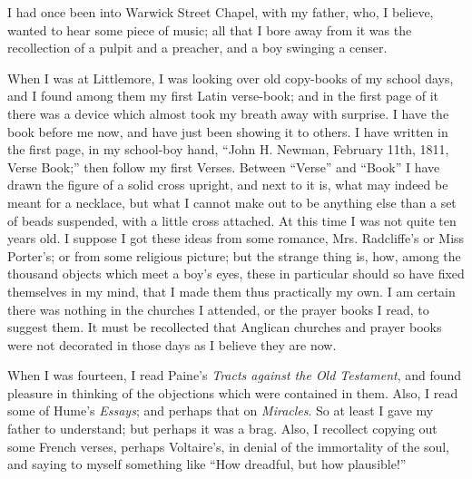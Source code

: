 I had once been into Warwick Street Chapel, with my father, who, I
believe, wanted to hear some piece of music; all that I bore away from
it was the recollection of a pulpit and a preacher, and a boy
swinging a censer.

When I was at Littlemore, I was looking over old copy-books of my
school days, and I found among them my first Latin verse-book; and in
the first page of it there was a device which almost took my breath
away with surprise. I have the book before me now, and have just
been showing it to others. I have written in the first page, in my
school-boy hand, ``John H. Newman, February 11th, 1811, Verse
Book;'' then follow my first Verses. Between ``Verse'' and
``Book'' I have drawn the figure of a solid cross upright, and
next to it is, what may indeed be meant for a necklace, but what I
cannot make out to be anything else than a set of beads suspended,
with a little cross attached. At this time I was not quite ten years
old. I suppose I got these ideas from some romance, Mrs. Radcliffe's or Miss Porter's; or from some
religious picture; but the strange thing is, how, among the thousand
objects which meet a boy's eyes, these in particular should so have
fixed themselves in my mind, that I made them thus practically my own.
I am certain there was nothing in the churches I attended, or the
prayer books I read, to suggest them. It must be recollected that Anglican churches and prayer books were not decorated in those
days as I believe they are now.

When I was fourteen, I read Paine's \emph{Tracts against the Old
Testament}, and found pleasure in thinking of the objections which were
contained in them. Also, I read some of Hume's \emph{Essays}; and perhaps
that on \emph{Miracles}. So at least I gave my father to understand; but
perhaps it was a brag. Also, I recollect copying out some French
verses, perhaps Voltaire's, in denial of the immortality of the soul, and saying to myself something
like ``How dreadful, but how plausible!''

